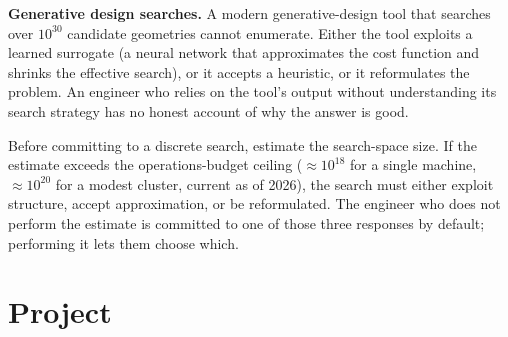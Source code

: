 \textbf{Generative design searches.} A modern generative-design
tool that searches over $10^{30}$ candidate geometries cannot
enumerate. Either the tool exploits a learned surrogate (a neural
network that approximates the cost function and shrinks the
effective search), or it accepts a heuristic, or it reformulates
the problem. An engineer who relies on the tool's output without
understanding its search strategy has no honest account of why
the answer is good.

\begin{principle}
Before committing to a discrete search, estimate the search-space
size. If the estimate exceeds the operations-budget ceiling
($\approx 10^{18}$ for a single machine, $\approx 10^{20}$ for a
modest cluster, current as of 2026), the search must either
exploit structure, accept approximation, or be reformulated. The
engineer who does not perform the estimate is committed to one of
those three responses by default; performing it lets them choose
which.
\end{principle}

\section{Project}

